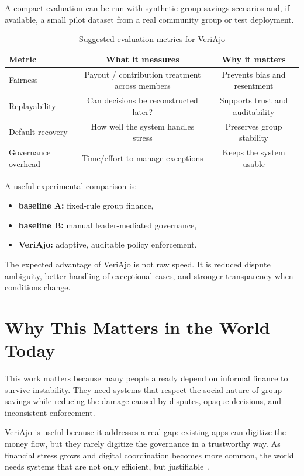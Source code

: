 \documentclass[10pt, conference]{IEEEtran}
\begin{document}
A compact evaluation can be run with synthetic group-savings scenarios and, if available, a small pilot dataset from a real community group or test deployment.

\begin{table}[t]
\centering
\caption{Suggested evaluation metrics for VeriAjo}
\label{tab:eval}
\begin{tabular}{lcc}
\toprule
Metric & What it measures & Why it matters \\
\midrule
Fairness & Payout / contribution treatment across members & Prevents bias and resentment \\
Replayability & Can decisions be reconstructed later? & Supports trust and auditability \\
Default recovery & How well the system handles stress & Preserves group stability \\
Governance overhead & Time/effort to manage exceptions & Keeps the system usable \\
\bottomrule
\end{tabular}
\end{table}

A useful experimental comparison is:
\begin{itemize}
    \item \textbf{baseline A:} fixed-rule group finance,
    \item \textbf{baseline B:} manual leader-mediated governance,
    \item \textbf{VeriAjo:} adaptive, auditable policy enforcement.
\end{itemize}

The expected advantage of VeriAjo is not raw speed. It is reduced dispute ambiguity, better handling of exceptional cases, and stronger transparency when conditions change.

\section{Why This Matters in the World Today}
This work matters because many people already depend on informal finance to survive instability. They need systems that respect the social nature of group savings while reducing the damage caused by disputes, opaque decisions, and inconsistent enforcement.

VeriAjo is useful because it addresses a real gap: existing apps can digitize the money flow, but they rarely digitize the governance in a trustworthy way. As financial stress grows and digital coordination becomes more common, the world needs systems that are not only efficient, but justifiable~\cite{worldbank2022financialinclusion}.
\end{document}

